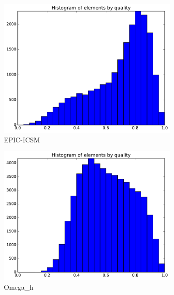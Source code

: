 \documentclass[3p,times,procedia,number]{elsarticle}
\begin{document}
\begin{figure}
\begin{subfigure}{.24\textwidth}
\includegraphics[width=\textwidth]{epic-icsm-cube-cylinder-polar-1-quality.pdf}
\caption{EPIC-ICSM}
\end{subfigure}
\begin{subfigure}{.24\textwidth}
\centering
\includegraphics[width=\textwidth]{omega_h-cube-cylinder-polar-1-quality.pdf}
\caption{Omega\_h}
\label{fig:omega_h-cube-cylinder-polar-1-quality}
\end{subfigure}
\begin{subfigure}{.24\textwidth}
\centering

\end{subfigure}
\end{figure}
\end{document}
